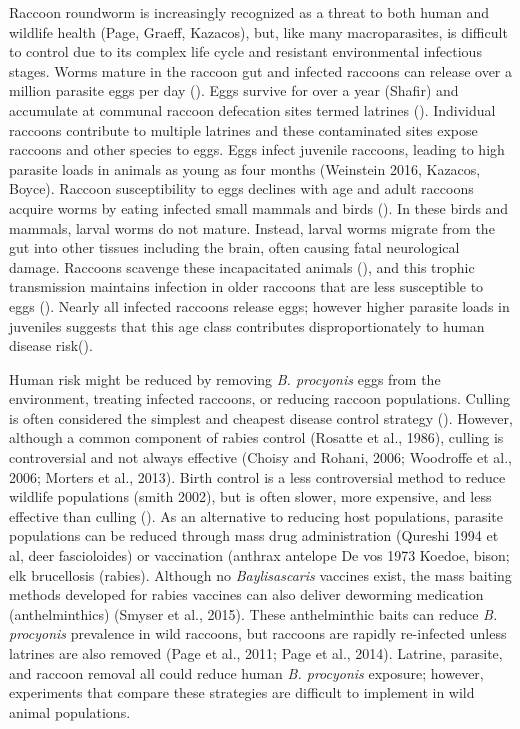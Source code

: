 \documentclass[11pt]{article}
\begin{document}
Raccoon roundworm is increasingly recognized as a threat to both human
and wildlife health (Page, Graeff, Kazacos), but, like many
macroparasites, is difficult to control due to its complex life cycle
and resistant environmental infectious stages. Worms mature in the
raccoon gut and infected raccoons can release over a million parasite
eggs per day (). Eggs survive for over a year (Shafir) and accumulate at
communal raccoon defecation sites termed latrines (). Individual
raccoons contribute to multiple latrines and these contaminated sites
expose raccoons and other species to eggs. Eggs infect juvenile
raccoons, leading to high parasite loads in animals as young as four
months (Weinstein 2016, Kazacos, Boyce). Raccoon susceptibility to eggs
declines with age and adult raccoons acquire worms by eating infected
small mammals and birds (). In these birds and mammals, larval worms do
not mature. Instead, larval worms migrate from the gut into other
tissues including the brain, often causing fatal neurological damage.
Raccoons scavenge these incapacitated animals (), and this trophic
transmission maintains infection in older raccoons that are less
susceptible to eggs (). Nearly all infected raccoons release eggs;
however higher parasite loads in juveniles suggests that this age class
contributes disproportionately to human disease risk().

Human risk might be reduced by removing \emph{B. procyonis} eggs from
the environment, treating infected raccoons, or reducing raccoon
populations. Culling is often considered the simplest and cheapest
disease control strategy (). However, although a common component of
rabies control (Rosatte et al., 1986), culling is controversial and not
always effective (Choisy and Rohani, 2006; Woodroffe et al., 2006;
Morters et al., 2013). Birth control is a less controversial method to
reduce wildlife populations (smith 2002), but is often slower, more
expensive, and less effective than culling (). As an alternative to
reducing host populations, parasite populations can be reduced through
mass drug administration (Qureshi 1994 et al, deer fascioloides) or
vaccination (anthrax antelope De vos 1973 Koedoe, bison; elk brucellosis
(rabies). Although no \emph{Baylisascaris} vaccines exist, the mass
baiting methods developed for rabies vaccines can also deliver deworming
medication (anthelminthics) (Smyser et al., 2015). These anthelminthic
baits can reduce \emph{B. procyonis} prevalence in wild raccoons, but
raccoons are rapidly re-infected unless latrines are also removed (Page
et al., 2011; Page et al., 2014). Latrine, parasite, and raccoon removal
all could reduce human \emph{B. procyonis} exposure; however,
experiments that compare these strategies are difficult to implement in
wild animal populations.
\end{document}

